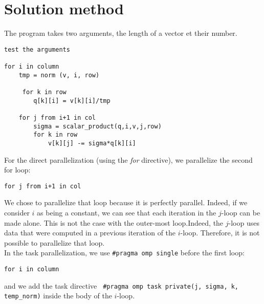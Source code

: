 \chapter{Solution method}

The program takes two arguments, the length of a vector et their number.

\begin{verbatim}
test the arguments

for i in column
    tmp = norm (v, i, row)

	 for k in row
        q[k][i] = v[k][i]/tmp

    for j from i+1 in col
        sigma = scalar_product(q,i,v,j,row)
        for k in row
            v[k][j] -= sigma*q[k][i]
\end{verbatim}

For the direct parallelization (using the \textit{for} directive), we parallelize the second for loop:
\begin{verbatim}
for j from i+1 in col
\end{verbatim}

We chose to parallelize that loop because it is perfectly parallel. Indeed, 
if we consider $i$ as being a constant, we can see that each iteration in the $j$-loop can be made alone. This is not the case with the outer-most loop.Indeed, the $j$-loop uses data that were computed in a previous iteration of the $i$-loop. Therefore, it is not possible to parallelize that loop.\\ 

In the task parallelization, we use \verb+#pragma omp single+ before the first loop:
\begin{verbatim}
for i in column
\end{verbatim}

and we add the task directive \verb+ #pragma omp task private(j, sigma, k, temp_norm)+ inside the body of the $i$-loop.
